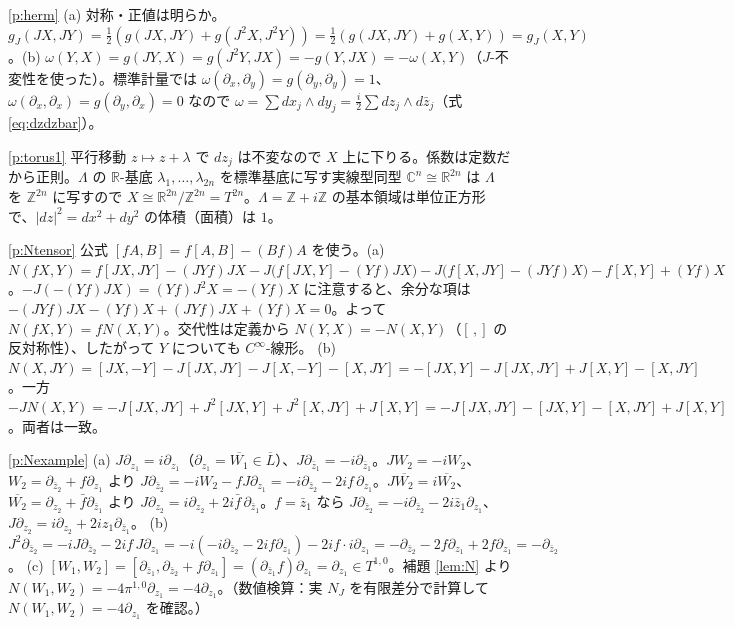 \begin{sol}{\ref{p:herm}}
(a) 対称・正値は明らか。$g_J(JX,JY)=\frac12(g(JX,JY)+g(J^2X,J^2Y))=\frac12(g(JX,JY)+g(X,Y))=g_J(X,Y)$。(b) $\omega(Y,X)=g(JY,X)=g(J^2Y,JX)=-g(Y,JX)=-\omega(X,Y)$（$J$-不変性を使った）。標準計量では $\omega(\partial_x,\partial_y)=g(\partial_y,\partial_y)=1$、$\omega(\partial_x,\partial_x)=g(\partial_y,\partial_x)=0$ なので $\omega=\sum dx_j\wedge dy_j=\frac i2\sum dz_j\wedge d\bar z_j$（式 \eqref{eq:dzdzbar}）。
\end{sol}
\begin{sol}{\ref{p:torus1}}
平行移動 $z\mapsto z+\lambda$ で $dz_j$ は不変なので $X$ 上に下りる。係数は定数だから正則。$\Lambda$ の $\mathbb R$-基底 $\lambda_1,\dots,\lambda_{2n}$ を標準基底に写す実線型同型 $\mathbb C^n\cong\mathbb R^{2n}$ は $\Lambda$ を $\mathbb Z^{2n}$ に写すので $X\cong\mathbb R^{2n}/\mathbb Z^{2n}=T^{2n}$。$\Lambda=\mathbb Z+i\mathbb Z$ の基本領域は単位正方形で、$|dz|^2=dx^2+dy^2$ の体積（面積）は $1$。
\end{sol}
\begin{sol}{\ref{p:Ntensor}}
公式 $[fA,B]=f[A,B]-(Bf)A$ を使う。(a) $N(fX,Y)=f[JX,JY]-(JYf)JX-J\big(f[JX,Y]-(Yf)JX\big)-J\big(f[X,JY]-(JYf)X\big)-f[X,Y]+(Yf)X$。$-J(-(Yf)JX)=(Yf)J^2X=-(Yf)X$ に注意すると、余分な項は $-(JYf)JX-(Yf)X+(JYf)JX+(Yf)X=0$。よって $N(fX,Y)=fN(X,Y)$。交代性は定義から $N(Y,X)=-N(X,Y)$（$[\,,]$ の反対称性）、したがって $Y$ についても $C^\infty$-線形。
(b) $N(X,JY)=[JX,-Y]-J[JX,JY]-J[X,-Y]-[X,JY]=-[JX,Y]-J[JX,JY]+J[X,Y]-[X,JY]$。一方 $-JN(X,Y)=-J[JX,JY]+J^2[JX,Y]+J^2[X,JY]+J[X,Y]=-J[JX,JY]-[JX,Y]-[X,JY]+J[X,Y]$。両者は一致。
\end{sol}
\begin{sol}{\ref{p:Nexample}}
(a) $J\partial_{z_1}=i\partial_{z_1}$（$\partial_{z_1}=\overline{W_1}\in\overline L$）、$J\partial_{\bar z_1}=-i\partial_{\bar z_1}$。$JW_2=-iW_2$、$W_2=\partial_{\bar z_2}+f\partial_{z_1}$ より $J\partial_{\bar z_2}=-iW_2-fJ\partial_{z_1}=-i\partial_{\bar z_2}-2if\,\partial_{z_1}$。$J\overline{W_2}=i\overline{W_2}$、$\overline{W_2}=\partial_{z_2}+\bar f\partial_{\bar z_1}$ より $J\partial_{z_2}=i\partial_{z_2}+2i\bar f\,\partial_{\bar z_1}$。$f=\bar z_1$ なら $J\partial_{\bar z_2}=-i\partial_{\bar z_2}-2i\bar z_1\partial_{z_1}$、$J\partial_{z_2}=i\partial_{z_2}+2iz_1\partial_{\bar z_1}$。
(b) $J^2\partial_{\bar z_2}=-iJ\partial_{\bar z_2}-2if\,J\partial_{z_1}=-i(-i\partial_{\bar z_2}-2if\partial_{z_1})-2if\cdot i\partial_{z_1}=-\partial_{\bar z_2}-2f\partial_{z_1}+2f\partial_{z_1}=-\partial_{\bar z_2}$。
(c) $[W_1,W_2]=[\partial_{\bar z_1},\partial_{\bar z_2}+f\partial_{z_1}]=(\partial_{\bar z_1}f)\partial_{z_1}=\partial_{z_1}\in T^{1,0}$。補題 \ref{lem:N} より $N(W_1,W_2)=-4\pi^{1,0}\partial_{z_1}=-4\partial_{z_1}$。（数値検算：実 $N_J$ を有限差分で計算して $N(W_1,W_2)=-4\partial_{z_1}$ を確認。）
\end{sol}
